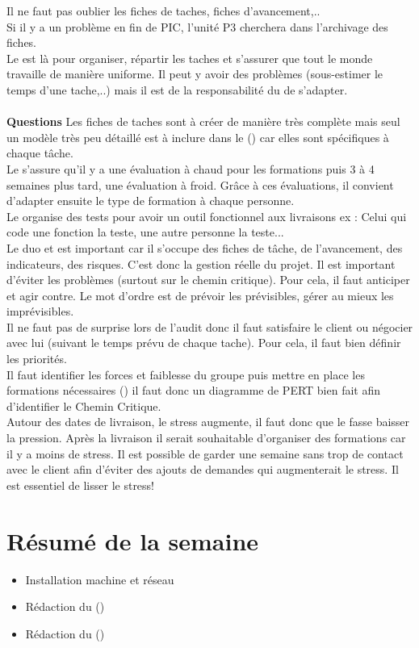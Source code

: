 \documentclass [a4paper] {article}
\begin{document}
Il ne faut pas oublier les fiches de taches, fiches d'avancement,.. \\
Si il y a un problème en fin de PIC, l'unité P3 cherchera dans l'archivage des fiches. 
\\
Le \CPCourt{} est là pour organiser, répartir les taches et s'assurer que tout le monde travaille de manière uniforme. Il peut y avoir des problèmes (sous-estimer le temps d'une tache,..) mais il est de la responsabilité du \CPCourt{} de s'adapter.
\\
~~\\
\textbf{Questions}
Les fiches de taches sont à créer de manière très complète mais seul un modèle très peu détaillé est à inclure dans le \PQ (\PQCourt) car elles sont spécifiques à chaque tâche.
\\
Le \RQCourt{} s'assure qu'il y a une évaluation à chaud pour les formations puis 3 à 4 semaines plus tard, une évaluation à froid. Grâce à ces évaluations, il convient d'adapter ensuite le type de formation à chaque personne.
\\
Le \RD{} organise des tests pour avoir un outil fonctionnel aux livraisons
ex : Celui qui code une fonction la teste, une autre personne la teste...
\\
Le duo \CPCourt{} et \RQCourt{} est important car il s'occupe des fiches de tâche, de l'avancement, des indicateurs, des risques. C'est donc la gestion réelle du projet. Il est important d'éviter les problèmes (surtout sur le chemin critique). Pour cela, il faut anticiper et agir contre. Le mot d'ordre est de prévoir les prévisibles, gérer au mieux les imprévisibles.
\\
Il ne faut pas de surprise lors de l'audit donc il faut satisfaire le client ou négocier avec lui (suivant le temps prévu de chaque tache). Pour cela, il faut bien définir les priorités.
\\
Il faut identifier les forces et faiblesse du groupe puis mettre en place les formations nécessaires (\RQCourt) il faut donc un diagramme de PERT bien fait afin d'identifier le Chemin Critique.
\\
Autour des dates de livraison, le stress augmente, il faut donc que le \CPCourt fasse baisser la pression. Après la livraison il serait souhaitable d'organiser des formations car il y a moins de stress. Il est possible de garder une semaine sans trop de contact avec le client afin d'éviter des ajouts de demandes qui augmenterait le stress.
Il est essentiel de lisser le stress!

\section{Résumé de la semaine}
\begin{itemize}
\item Installation machine et réseau
\item Rédaction du \PQ (\PQCourt)
\item Rédaction du \PGC (\PGCCourt)
\end{itemize}
\end{document}
